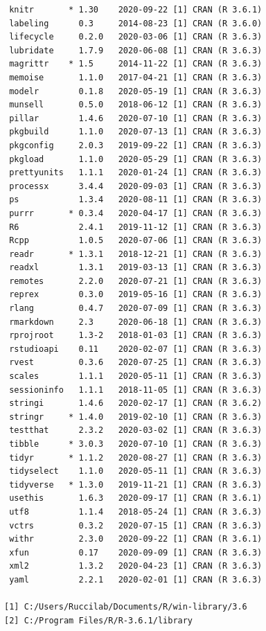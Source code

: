 \documentclass[
]{article}
\begin{document}
\begin{verbatim}
 knitr       * 1.30    2020-09-22 [1] CRAN (R 3.6.1)
 labeling      0.3     2014-08-23 [1] CRAN (R 3.6.0)
 lifecycle     0.2.0   2020-03-06 [1] CRAN (R 3.6.3)
 lubridate     1.7.9   2020-06-08 [1] CRAN (R 3.6.3)
 magrittr    * 1.5     2014-11-22 [1] CRAN (R 3.6.3)
 memoise       1.1.0   2017-04-21 [1] CRAN (R 3.6.3)
 modelr        0.1.8   2020-05-19 [1] CRAN (R 3.6.3)
 munsell       0.5.0   2018-06-12 [1] CRAN (R 3.6.3)
 pillar        1.4.6   2020-07-10 [1] CRAN (R 3.6.3)
 pkgbuild      1.1.0   2020-07-13 [1] CRAN (R 3.6.3)
 pkgconfig     2.0.3   2019-09-22 [1] CRAN (R 3.6.3)
 pkgload       1.1.0   2020-05-29 [1] CRAN (R 3.6.3)
 prettyunits   1.1.1   2020-01-24 [1] CRAN (R 3.6.3)
 processx      3.4.4   2020-09-03 [1] CRAN (R 3.6.3)
 ps            1.3.4   2020-08-11 [1] CRAN (R 3.6.3)
 purrr       * 0.3.4   2020-04-17 [1] CRAN (R 3.6.3)
 R6            2.4.1   2019-11-12 [1] CRAN (R 3.6.3)
 Rcpp          1.0.5   2020-07-06 [1] CRAN (R 3.6.3)
 readr       * 1.3.1   2018-12-21 [1] CRAN (R 3.6.3)
 readxl        1.3.1   2019-03-13 [1] CRAN (R 3.6.3)
 remotes       2.2.0   2020-07-21 [1] CRAN (R 3.6.3)
 reprex        0.3.0   2019-05-16 [1] CRAN (R 3.6.3)
 rlang         0.4.7   2020-07-09 [1] CRAN (R 3.6.3)
 rmarkdown     2.3     2020-06-18 [1] CRAN (R 3.6.3)
 rprojroot     1.3-2   2018-01-03 [1] CRAN (R 3.6.3)
 rstudioapi    0.11    2020-02-07 [1] CRAN (R 3.6.3)
 rvest         0.3.6   2020-07-25 [1] CRAN (R 3.6.3)
 scales        1.1.1   2020-05-11 [1] CRAN (R 3.6.3)
 sessioninfo   1.1.1   2018-11-05 [1] CRAN (R 3.6.3)
 stringi       1.4.6   2020-02-17 [1] CRAN (R 3.6.2)
 stringr     * 1.4.0   2019-02-10 [1] CRAN (R 3.6.3)
 testthat      2.3.2   2020-03-02 [1] CRAN (R 3.6.3)
 tibble      * 3.0.3   2020-07-10 [1] CRAN (R 3.6.3)
 tidyr       * 1.1.2   2020-08-27 [1] CRAN (R 3.6.3)
 tidyselect    1.1.0   2020-05-11 [1] CRAN (R 3.6.3)
 tidyverse   * 1.3.0   2019-11-21 [1] CRAN (R 3.6.3)
 usethis       1.6.3   2020-09-17 [1] CRAN (R 3.6.1)
 utf8          1.1.4   2018-05-24 [1] CRAN (R 3.6.3)
 vctrs         0.3.2   2020-07-15 [1] CRAN (R 3.6.3)
 withr         2.3.0   2020-09-22 [1] CRAN (R 3.6.1)
 xfun          0.17    2020-09-09 [1] CRAN (R 3.6.3)
 xml2          1.3.2   2020-04-23 [1] CRAN (R 3.6.3)
 yaml          2.2.1   2020-02-01 [1] CRAN (R 3.6.3)

[1] C:/Users/Ruccilab/Documents/R/win-library/3.6
[2] C:/Program Files/R/R-3.6.1/library
\end{verbatim}

\normalsize
\end{document}
